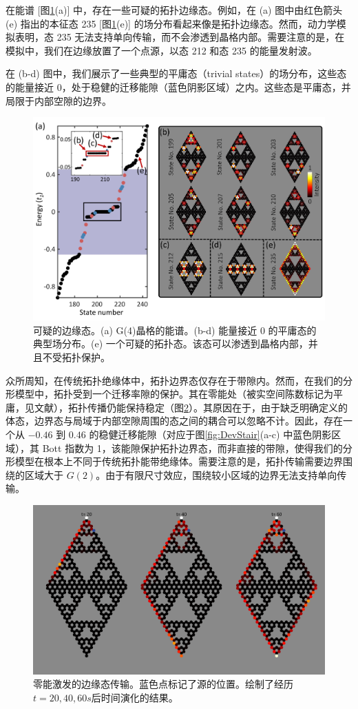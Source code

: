 在能谱 [图\ref{fig:SuspEdge}(a)] 中，存在一些可疑的拓扑边缘态。例如，在 (a) 图中由红色箭头 (e) 指出的本征态 235 [图\ref{fig:SuspEdge}(e)] 的场分布看起来像是拓扑边缘态。然而，动力学模拟表明，态 235 无法支持单向传输，而不会渗透到晶格内部。需要注意的是，在模拟中，我们在边缘放置了一个点源，以态 212 和态 235 的能量发射波。

在 (b-d) 图中，我们展示了一些典型的平庸态（trivial states）的场分布，这些态的能量接近 0，处于稳健的迁移能隙（蓝色阴影区域）之内。这些态是平庸态，并局限于内部空隙的边界。
\begin{figure}[htbp]
    \centering
    \includegraphics[width=0.75\linewidth]{figure/FracHaldTheo/SuspEdge.jpg}
    \caption{可疑的边缘态。(a) G(4)晶格的能谱。(b-d) 能量接近 0 的平庸态的典型场分布。(e) 一个可疑的拓扑态。该态可以渗透到晶格内部，并且不受拓扑保护。}
    \label{fig:SuspEdge}
\end{figure}

众所周知，在传统拓扑绝缘体中，拓扑边界态仅存在于带隙内。然而，在我们的分形模型中，拓扑受到一个迁移率隙的保护。其在零能处（被实空间陈数标记为平庸，见文献\cite{yang2020photonic,biesenthal2022fractal}），拓扑传播仍能保持稳定（图\ref{fig:ZeroEvo}）。其原因在于，由于缺乏明确定义的体态，边界态与局域于内部空隙周围的态之间的耦合可以忽略不计。因此，存在一个从 $-0.46$ 到 $0.46$ 的稳健迁移能隙（对应于图\ref{fig:DevStair}(a-c) 中蓝色阴影区域），其 Bott 指数为 1，该能隙保护拓扑边界态，而非直接的带隙，使得我们的分形模型在根本上不同于传统拓扑能带绝缘体。需要注意的是，拓扑传输需要边界围绕的区域大于 $G(2)$。由于有限尺寸效应，围绕较小区域的边界无法支持单向传输。
\begin{figure}
    \centering
    \includegraphics[width=0.75\linewidth]{figure/FracHaldTheo/ZeroEvo.png}
    \caption{零能激发的边缘态传输。蓝色点标记了源的位置。绘制了经历$t=20,40,60s$后时间演化的结果。}
    \label{fig:ZeroEvo}
\end{figure}
